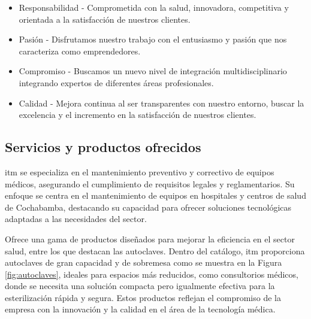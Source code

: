 \begin{itemize}
    \item Responsabilidad - Comprometida con la salud, innovadora, competitiva y orientada a la satisfacción de nuestros clientes.
    \item Pasión - Disfrutamos nuestro trabajo con el entusiasmo y pasión que nos caracteriza como emprendedores.
    \item Compromiso - Buscamos un nuevo nivel de integración multidisciplinario integrando expertos de diferentes áreas profesionales.
    \item Calidad - Mejora continua al ser transparentes con nuestro entorno, buscar la excelencia y el incremento en la satisfacción de nuestros clientes.
\end{itemize}

\subsection{Servicios y productos ofrecidos}
\acrshort{itm} se especializa en el mantenimiento preventivo y correctivo de equipos médicos, asegurando el cumplimiento de requisitos legales y reglamentarios. Su enfoque se centra en el mantenimiento de equipos en hospitales y centros de salud de Cochabamba, destacando su capacidad para ofrecer soluciones tecnológicas adaptadas a las necesidades del sector.

Ofrece una gama de productos diseñados para mejorar la eficiencia en el sector salud, entre los que destacan las autoclaves. Dentro del catálogo, \acrshort{itm} proporciona autoclaves de gran capacidad y de sobremesa como se muestra en la Figura \ref{fig:autoclaves}, ideales para espacios más reducidos, como consultorios médicos, donde se necesita una solución compacta pero igualmente efectiva para la esterilización rápida y segura. Estos productos reflejan el compromiso de la empresa con la innovación y la calidad en el área de la tecnología médica.

